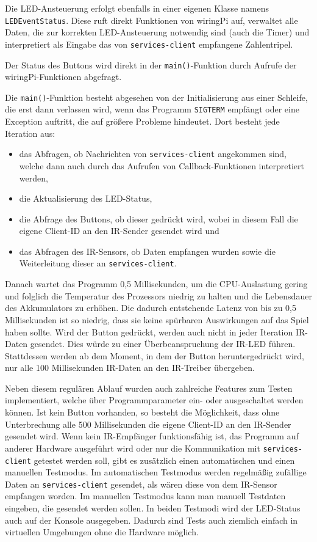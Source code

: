Die LED-Ansteuerung erfolgt ebenfalls in einer eigenen Klasse namens \texttt{LEDEventStatus}.
Diese ruft direkt Funktionen von wiringPi auf, verwaltet alle Daten, die zur korrekten
LED-Ansteuerung notwendig sind (auch die Timer) und interpretiert als Eingabe das von
\texttt{services-client} empfangene Zahlentripel.

Der Status des Buttons wird direkt in der \texttt{main()}-Funktion durch Aufrufe der
wiringPi-Funktionen abgefragt.

Die \texttt{main()}-Funktion besteht abgesehen von der Initialisierung aus einer Schleife, die erst
dann verlassen wird, wenn das Programm \texttt{SIGTERM} empfängt oder eine Exception auftritt, die
auf größere Probleme hindeutet.
Dort besteht jede Iteration aus:
\begin{itemize}
  \item
    das Abfragen, ob Nachrichten von \texttt{services-client} angekommen sind, welche dann auch
    durch das Aufrufen von Callback-Funktionen interpretiert werden,
  \item
    die Aktualisierung des LED-Status,
  \item
    die Abfrage des Buttons, ob dieser gedrückt wird, wobei in diesem Fall die eigene Client-ID an
    den IR-Sender gesendet wird und
  \item
    das Abfragen des IR-Sensors, ob Daten empfangen wurden sowie die Weiterleitung dieser an
    \texttt{services-client}.
\end{itemize}
Danach wartet das Programm 0,5 Millisekunden, um die CPU-Auslastung gering und folglich die
Temperatur des Prozessors niedrig zu halten und die Lebensdauer des Akkumulators zu erhöhen.
Die dadurch entstehende Latenz von bis zu 0,5 Millisekunden ist so niedrig, dass sie keine spürbaren
Auswirkungen auf das Spiel haben sollte.
Wird der Button gedrückt, werden auch nicht in jeder Iteration IR-Daten gesendet.
Dies würde zu einer Überbeanspruchung der IR-LED führen.
Stattdessen werden ab dem Moment, in dem der Button heruntergedrückt wird, nur alle 100
Millisekunden IR-Daten an den IR-Treiber übergeben.

Neben diesem regulären Ablauf wurden auch zahlreiche Features zum Testen implementiert, welche über
Programmparameter ein- oder ausgeschaltet werden können.
Ist kein Button vorhanden, so besteht die Möglichkeit, dass ohne Unterbrechung alle 500
Millisekunden die eigene Client-ID an den IR-Sender gesendet wird.
Wenn kein IR-Empfänger funktionsfähig ist, das Programm auf anderer Hardware ausgeführt wird oder
nur die Kommunikation mit \texttt{services-client} getestet werden soll, gibt es zusätzlich einen
automatischen und einen manuellen Testmodus.
Im automatischen Testmodus werden regelmäßig zufällige Daten an \texttt{services-client} gesendet,
als wären diese von dem IR-Sensor empfangen worden.
Im manuellen Testmodus kann man manuell Testdaten eingeben, die gesendet werden sollen.
In beiden Testmodi wird der LED-Status auch auf der Konsole ausgegeben.
Dadurch sind Tests auch ziemlich einfach in virtuellen Umgebungen ohne die Hardware möglich.

